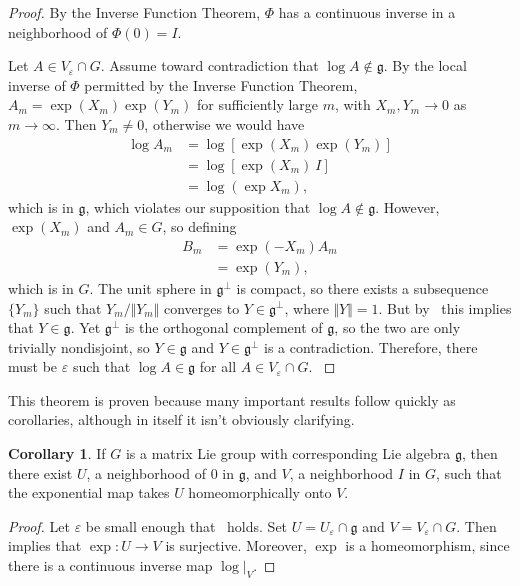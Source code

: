 \documentclass[12pt]{article}
\newcommand{\g}{\mathfrak{g}}
\newcommand{\V}{\Vert}
\theoremstyle{definition}
\theoremstyle{definition}
\newtheorem{cor}[them]{Corollary}
\theoremstyle{definition}
\theoremstyle{definition}
\theoremstyle{definition}
\theoremstyle{definition}
\theoremstyle{definition}
\theoremstyle{definition}
\begin{document}
\begin{proof}
\par{By the Inverse Function
Theorem, $\Phi$ has a continuous inverse in a
neighborhood of $\Phi(0) = I$.} 

\par{Let $A \in
V_\varepsilon \cap G$. Assume toward contradiction
that $\log A \not\in \g$. By the local inverse of
$\Phi$ permitted by the Inverse Function Theorem, $A_m =
\exp(X_m)\exp(Y_m)$ for sufficiently large $m$, with $X_m, Y_m \to
0$ as $m \to \infty$. Then $Y_m \neq 0$, otherwise
we would have
\[
\begin{aligned}
    \log A_m & = \log [\exp(X_m) \exp(Y_m)] \\ 
    & = \log [\exp(X_m) \: I] \\
    & = \log(\exp X_m),    
\end{aligned}
\]
which is in $\g$, which violates our supposition that $\log A \not
\in \g$. However, $\exp(X_m)$ and $A_m \in G$,
so defining 
\[
\begin{aligned}
    B_m & = \exp(-X_m) A_m \\ 
    & = \exp(Y_m),
\end{aligned}
\] 
which is in $G$. The unit sphere in $\g^\bot$ is compact, so there
exists a subsequence $\{Y_m\}$ such that $Y_m / \V
Y_m \V$ converges to $Y \in \g^\bot$, where $\V Y
\V = 1$. But by~ this implies that $Y \in
\g$. Yet $\g^\bot$ is the orthogonal complement of
$\g$, so the two are only trivially nondisjoint,
so $Y \in \g$ and $Y \in \g^\bot$ is a
contradiction. Therefore, there must be
$\varepsilon$ such that $\log A \in \g$ for all $A
\in V_\varepsilon \cap G$. }
\end{proof}

\par{This theorem is proven because many important results follow quickly as corollaries, although in itself it isn’t obviously clarifying.}

\begin{cor}
If $G$ is a matrix Lie group with
corresponding Lie algebra $\g$, then there
exist $U$, a neighborhood of $0$ in $\g$, and $V$, a
neighborhood $I$ in $G$, such that the
exponential map takes $U$ homeomorphically
onto $V$.
\end{cor}
\begin{proof}
Let $\varepsilon$ be small enough
that~ holds. Set $U =
U_\varepsilon \cap \g$ and $V = V_\varepsilon \cap
G$. Then~ implies that $\exp: U
\to V$ is surjective. Moreover, $\exp$ is a
homeomorphism, since there is a continuous
inverse map $\log\big|_{V}$.
\end{proof}
\end{document}
